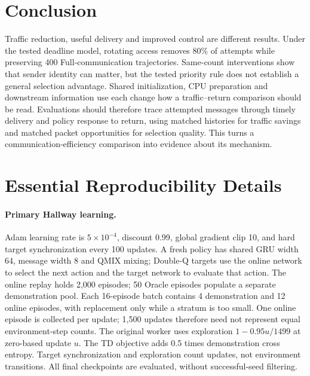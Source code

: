 \documentclass[10pt]{article}
\begin{document}
\section{Conclusion}
Traffic reduction, useful delivery and improved control are different results. Under the tested deadline model, rotating access removes 80\% of attempts while preserving 400 Full-communication trajectories. Same-count interventions show that sender identity can matter, but the tested priority rule does not establish a general selection advantage. Shared initialization, CPU preparation and downstream information use each change how a traffic--return comparison should be read. Evaluations should therefore trace attempted messages through timely delivery and policy response to return, using matched histories for traffic savings and matched packet opportunities for selection quality. This turns a communication-efficiency comparison into evidence about its mechanism.

\clearpage
\clearpage\appendix
\section{Essential Reproducibility Details}\label{app:settings}
\paragraph{Primary Hallway learning.} Adam learning rate is $5\times10^{-4}$, discount 0.99, global gradient clip 10, and hard target synchronization every 100 updates. A fresh policy has shared GRU width 64, message width 8 and QMIX mixing; Double-Q targets use the online network to select the next action and the target network to evaluate that action. The online replay holds 2,000 episodes; 50 Oracle episodes populate a separate demonstration pool. Each 16-episode batch contains 4 demonstration and 12 online episodes, with replacement only while a stratum is too small. One online episode is collected per update; 1,500 updates therefore need not represent equal environment-step counts. The original worker uses exploration $1-0.95u/1499$ at zero-based update $u$. The TD objective adds 0.5 times demonstration cross entropy. Target synchronization and exploration count updates, not environment transitions. All final checkpoints are evaluated, without successful-seed filtering.
\end{document}
